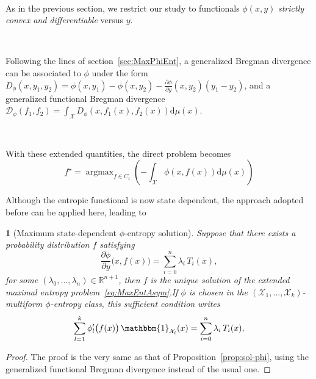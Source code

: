 \documentclass[english,sort&compress]{elsarticle}
\theoremstyle{definition}
\theoremstyle{plain}
\newtheorem{prop}{\protect\propositionname}
\theoremstyle{plain}
\providecommand{\propositionname}{Proposition}
\def\dmu{\mathrm{d}\mu}
\def\fD{\mathcal{D}}
\def\Rset{\mathbb{R}}
\def\X{\mathcal{X}}
\def\un{\mathbbm{1}}
\DeclareMathOperator*{\argmax}{\operatorname{argmax}}
\begin{document}

\

As in  the previous  section, we restrict  our study to  functionals $\phi(x,y)$
{\em strictly convex and differentiable} versus $y$.

\

Following  the  lines  of  section~\ref{sec:MaxPhiEnt},  a  generalized  Bregman
divergence  can be  associated to  $\phi$  under the  form $D_\phi(x,y_1,y_2)  =
\phi(x,y_1) - \phi(x,y_2) - \frac{\partial \phi}{\partial y}(x,y_2) \left( y_1 -
  y_2 \right)$,  and a generalized functional  Bregman divergence $\displaystyle
\fD_\phi(f_1,f_2) = \int_\X D_\phi(x,f_1(x),f_2(x)) \dmu(x)$.

\

With these extended quantities, the direct problem becomes
%
\begin{equation}\label{eq:MaxEntAsym}
f^\star = \argmax_{f \in C_t} \left( - \int_\X \phi(x,f(x)) \dmu(x) \right)
\end{equation}

Although the  entropic functional is  now state dependent, the  approach adopted
before can be applied here, leading to

\begin{prop}[Maximum                state-dependent               $\phi$-entropy
  solution]\label{prop:sol-asym_phi}
%
  Suppose that there exists a probability distribution $f$ satisfying
  \begin{equation}\label{eq:sol-asym_phi}
  \frac{\partial \phi}{\partial y}\big(x,f(x)\big) = \sum_{i=0}^n \lambda_i \,
T_i(x),
  \end{equation}
  for  some  $(\lambda_0,\ldots,\lambda_n) \in  \Rset^{n+1}$,  then  $f$ is  the
  unique      solution      of       the      extended      maximal      entropy
  problem~\eqref{eq:MaxEntAsym}.\newline  If $\phi$  is chosen  in the  $(\X_1 ,
  \ldots  ,  \X_k)$-multiform $\phi$-entropy  class,  this sufficient  condition
  writes
  \begin{equation}\label{eq:sol-multiform_phi}
  \sum_{l=1}^k \phi_l'\big(f(x)\big) \, \un_{\X_l}(x) =
  \sum_{i=0}^n \lambda_i \, T_i(x),
  \end{equation}
\end{prop}
%
\begin{proof}
  The proof  is the very  same as that of  Proposition~\ref{prop:sol-phi}, using
  the generalized functional Bregman divergence instead of the usual one.
\end{proof}
\end{document}
